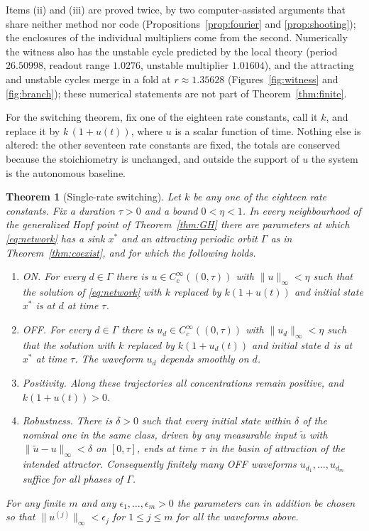 \documentclass[11pt,a4paper]{article}
\theoremstyle{plain}
\newtheorem{theorem}{Theorem}[section]
\theoremstyle{definition}
\theoremstyle{remark}
\newcommand{\norm}[1]{\lVert#1\rVert}
\begin{document}
Items (ii) and (iii) are proved twice, by two computer-assisted arguments that share neither method nor code (Propositions~\ref{prop:fourier} and \ref{prop:shooting}); the enclosures of the individual multipliers come from the second. Numerically the witness also has the unstable cycle predicted by the local theory (period $26.50998$, readout range $1.0276$, unstable multiplier $1.01604$), and the attracting and unstable cycles merge in a fold at $r\approx1.35628$ (Figures~\ref{fig:witness} and \ref{fig:branch}); these numerical statements are not part of Theorem~\ref{thm:finite}.

For the switching theorem, fix one of the eighteen rate constants, call it $k$, and replace it by $k\,(1+u(t))$, where $u$ is a scalar function of time. Nothing else is altered: the other seventeen rate constants are fixed, the totals are conserved because the stoichiometry is unchanged, and outside the support of $u$ the system is the autonomous baseline.

\begin{theorem}[Single-rate switching]\label{thm:switch}
Let $k$ be any one of the eighteen rate constants. Fix a duration $\tau>0$ and a bound $0<\eta<1$. In every neighbourhood of the generalized Hopf point of Theorem~\ref{thm:GH} there are parameters at which \eqref{eq:network} has a sink $x^*$ and an attracting periodic orbit $\Gamma$ as in Theorem~\ref{thm:coexist}, and for which the following holds.
\begin{enumerate}[label=\textup{(\roman*)},leftmargin=*]
\item \emph{ON.} For every $d\in\Gamma$ there is $u\in C_c^\infty((0,\tau))$ with $\norm u_\infty<\eta$ such that the solution of \eqref{eq:network} with $k$ replaced by $k(1+u(t))$ and initial state $x^*$ is at $d$ at time $\tau$.
\item \emph{OFF.} For every $d\in\Gamma$ there is $u_d\in C_c^\infty((0,\tau))$ with $\norm{u_d}_\infty<\eta$ such that the solution with $k$ replaced by $k(1+u_d(t))$ and initial state $d$ is at $x^*$ at time $\tau$. The waveform $u_d$ depends smoothly on $d$.
\item \emph{Positivity.} Along these trajectories all concentrations remain positive, and $k(1+u(t))>0$.
\item \emph{Robustness.} There is $\delta>0$ such that every initial state within $\delta$ of the nominal one in the same class, driven by any measurable input $\tilde u$ with $\norm{\tilde u-u}_\infty<\delta$ on $[0,\tau]$, ends at time $\tau$ in the basin of attraction of the intended attractor. Consequently finitely many OFF waveforms $u_{d_1},\dots,u_{d_m}$ suffice for all phases of $\Gamma$.
\end{enumerate}
For any finite $m$ and any $\epsilon_1,\dots,\epsilon_m>0$ the parameters can in addition be chosen so that $\norm{u^{(j)}}_\infty<\epsilon_j$ for $1\le j\le m$ for all the waveforms above.
\end{theorem}
\end{document}
